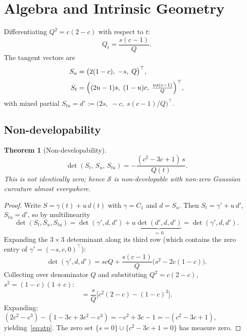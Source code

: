 \documentclass[12pt]{article}
\newtheorem{theorem}{Theorem}[section]
\begin{document}
\section{Algebra and Intrinsic Geometry}
\label{sec:alg}

Differentiating $Q^2 = c(2-c)$ with respect to $t$:
\begin{equation}
  Q_t = \frac{s(c-1)}{Q}.
  \label{eq:Qt}
\end{equation}
The tangent vectors are
\begin{align}
  S_u &= \bigl(2(1-c),\;-s,\;Q\bigr)^\top, \label{eq:Su}\\[2pt]
  S_t &= \Bigl((2u-1)s,\;(1-u)c,\;\tfrac{us(c-1)}{Q}\Bigr)^\top,
  \label{eq:St}
\end{align}
with mixed partial $S_{tu}=d':=\bigl(2s,\;-c,\;s(c-1)/Q\bigr)^\top$.

\subsection{Non-developability}

\begin{theorem}[Non-developability]
\label{thm:nondevel}
\begin{equation}
  \det(S_t,\,S_u,\,S_{tu})
  = -\frac{(c^2-3c+1)\,s}{Q(t)}.
  \label{eq:stp}
\end{equation}
This is not identically zero; hence $\mathcal{S}$ is non-developable
with non-zero Gaussian curvature almost everywhere.
\end{theorem}

\begin{proof}
Write $S = \gamma(t)+u\,d(t)$ with $\gamma=C_1$ and $d=S_u$.
Then $S_t = \gamma'+u\,d'$, $S_{tu}=d'$, so by multilinearity
\[
  \det(S_t,S_u,S_{tu})
  = \det(\gamma',d,d') + u\underbrace{\det(d',d,d')}_{=\,0}
  = \det(\gamma',d,d').
\]
Expanding the $3\times 3$ determinant along its third row
(which contains the zero entry of $\gamma'=(-s,c,0)^\top$):
\[
  \det(\gamma',d,d')
  = scQ + \frac{s(c-1)}{Q}\bigl(s^2-2c(1-c)\bigr).
\]
Collecting over denominator $Q$ and substituting
$Q^2=c(2-c)$, $s^2=(1-c)(1+c)$:
\[
  = \frac{s}{Q}\bigl[c^2(2-c)-(1-c)^3\bigr].
\]
Expanding: $(2c^2-c^3)-(1-3c+3c^2-c^3) = -c^2+3c-1 = -(c^2-3c+1)$,
yielding~\eqref{eq:stp}.
The zero set $\{s=0\}\cup\{c^2-3c+1=0\}$ has measure zero.
\end{proof}
\end{document}
